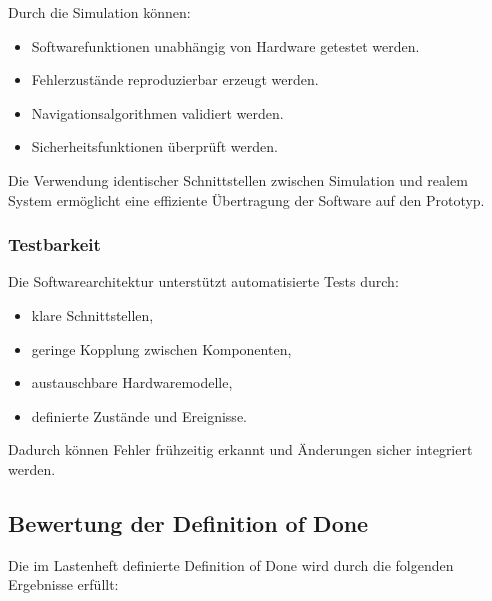 Durch die Simulation können:

\begin{itemize}
\tightlist
\item
  Softwarefunktionen unabhängig von Hardware getestet werden.
\item
  Fehlerzustände reproduzierbar erzeugt werden.
\item
  Navigationsalgorithmen validiert werden.
\item
  Sicherheitsfunktionen überprüft werden.
\end{itemize}

Die Verwendung identischer Schnittstellen zwischen Simulation und realem
System ermöglicht eine effiziente Übertragung der Software auf den
Prototyp.

\subsubsection{Testbarkeit}\label{testbarkeit}

Die Softwarearchitektur unterstützt automatisierte Tests durch:

\begin{itemize}
\tightlist
\item
  klare Schnittstellen,
\item
  geringe Kopplung zwischen Komponenten,
\item
  austauschbare Hardwaremodelle,
\item
  definierte Zustände und Ereignisse.
\end{itemize}

Dadurch können Fehler frühzeitig erkannt und Änderungen sicher
integriert werden.

\subsection{Bewertung der Definition of
Done}\label{bewertung-der-definition-of-done}

Die im Lastenheft definierte Definition of Done wird durch die folgenden
Ergebnisse erfüllt:


